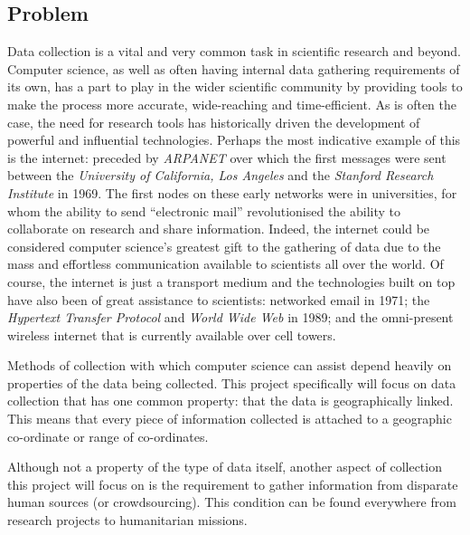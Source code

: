 \documentclass{article}
\begin{document}
		\subsection{Problem}
		Data collection is a vital and very common task in scientific research and beyond. Computer science, as well as often having internal data gathering requirements of its own, has a part to play in the wider scientific community by providing tools to make the process more accurate, wide-reaching and time-efficient. As is often the case, the need for research tools has historically driven the development of powerful and influential technologies\cite{haggerty_spinoff_1991}. Perhaps the most indicative example of this is the internet: preceded by \emph{ARPANET} over which the first messages were sent between the \emph{University of California, Los Angeles} and the \emph{Stanford Research Institute} in 1969\cite{_arpanet_????}. The first nodes on these early networks were in universities, for whom the ability to send ``electronic mail'' revolutionised the ability to collaborate on research and share information\cite{benfield_internet-based_2006}. Indeed, the internet could be considered computer science's greatest gift to the gathering of data due to the mass and effortless communication available to scientists all over the world\cite{benfield_internet-based_2006}. Of course, the internet is just a transport medium and the technologies built on top have also been of great assistance to scientists: networked email in 1971\cite{_first_????}; the \emph{Hypertext Transfer Protocol} and \emph{World Wide Web} in 1989\cite{_http_????}; and the omni-present wireless internet that is currently available over cell towers.

		Methods of collection with which computer science can assist depend heavily on properties of the data being collected. This project specifically will focus on data collection that has one common property: that the data is geographically linked. This means that every piece of information collected is attached to a geographic co-ordinate or range of co-ordinates.

		Although not a property of the type of data itself, another aspect of collection this project will focus on is the requirement to gather information from disparate human sources (or crowdsourcing). This condition can be found everywhere from research projects to humanitarian missions.
\end{document}
